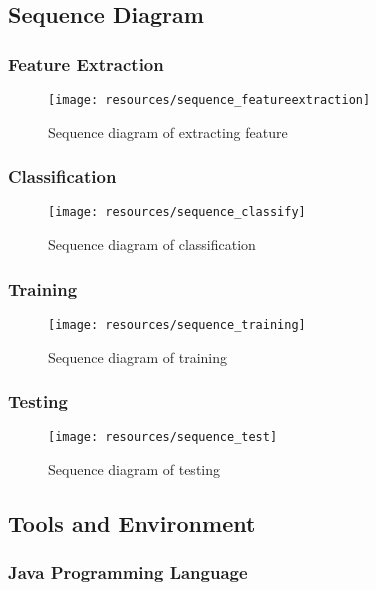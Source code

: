 \subsection{Sequence Diagram}
\subsubsection{Feature Extraction}
\begin{figure}[h]
        \centering
        \texttt{[image: resources/sequence\_featureextraction]}
        \caption{Sequence diagram of extracting feature}
        \label{fig:sequence_featureextraction}
\end{figure}
\newpage
\subsubsection{Classification}
\begin{figure}[h]
        \centering
        \texttt{[image: resources/sequence\_classify]}
        \caption{Sequence diagram of classification}
        \label{fig:sequence_classify}
\end{figure}
\newpage
\subsubsection{Training}
\begin{figure}[h]
        \centering
        \texttt{[image: resources/sequence\_training]}
        \caption{Sequence diagram of training}
        \label{fig:sequence_training}
\end{figure}
\newpage
\newpage
\subsubsection{Testing}
\begin{figure}[h]
        \centering
        \texttt{[image: resources/sequence\_test]}
        \caption{Sequence diagram of testing}
        \label{fig:sequence_test}
\end{figure}


\subsection{Tools and Environment}

\subsubsection{Java Programming Language}

